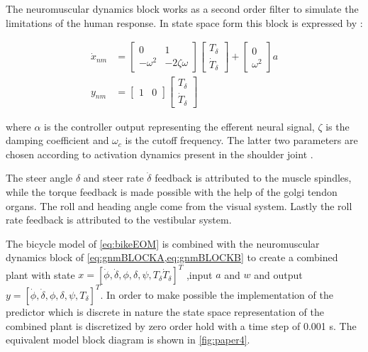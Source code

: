 The neuromuscular dynamics block works as a second order filter to simulate the limitations of the human response. In state space form this block is expressed by :

\begin{align}
\dot{x}_{nm} &= \begin{bmatrix}0 & 1 \\ -\omega^2 & -2\zeta\omega\end{bmatrix} \begin{bmatrix} T_\delta \\ \dot{T}_\delta\end{bmatrix} + \begin{bmatrix} 0 \\ \omega^2\end{bmatrix} a     \label{eq:gnmBLOCKA}    
    \\
y_{nm} &= \begin{bmatrix}1 & 0\end{bmatrix} \begin{bmatrix} T_\delta \\ \dot{T}_\delta\end{bmatrix}
    \label{eq:gnmBLOCKB}
\end{align}

where \ensuremath{\alpha} is the controller output representing the efferent neural signal, \ensuremath{\zeta} is the damping coefficient and \ensuremath{\omega_c} is the cutoff frequency. The latter two   parameters are chosen according to activation dynamics present in the shoulder joint \cite{happee2008posture}.

The steer angle \(\delta\) and steer rate \(\dot{\delta}\) feedback is attributed to the muscle spindles, while the torque feedback is made possible with the help of the golgi tendon organs. The roll and heading angle come from the visual system. Lastly the roll rate feedback is attributed to the vestibular system. 

The bicycle model of \cref{eq:bikeEOM} is combined with the neuromuscular dynamics block of \cref{eq:gnmBLOCKA,eq:gnmBLOCKB} to create a combined  plant with state \ensuremath{x=[\dot{\phi}, \dot{\delta}, \phi, \delta, \psi, T_\delta \dot{T}_\delta]^{T}} ,input \ensuremath{a} and \ensuremath{w} and output \ensuremath{y=[\dot{\phi}, \dot{\delta}, \phi, \delta, \psi, T_\delta]^{T}}. In order to make possible the implementation of the predictor which is discrete in nature the state space representation of the combined plant is discretized by zero order hold with a time step of 0.001 \si{\second}. The equivalent model block diagram is shown in \cref{fig:paper4}.

